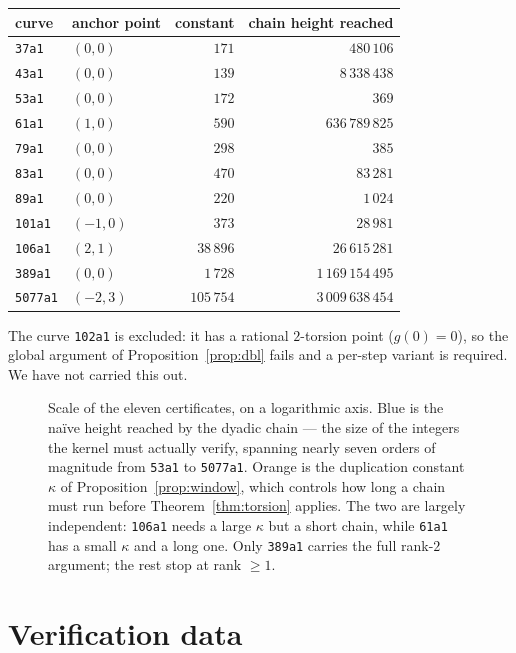 \documentclass[11pt,reqno]{amsart}
\newcommand{\pffig}[1]{}
\theoremstyle{plain}
\theoremstyle{definition}
\theoremstyle{remark}
\begin{document}
\begin{center}
\begin{tabular}{llrr}
\toprule
curve & anchor point & constant & chain height reached\\
\midrule
\texttt{37a1}   & $(0,0)$  & $171$ & $480\,106$\\
\texttt{43a1}   & $(0,0)$  & $139$ & $8\,338\,438$\\
\texttt{53a1}   & $(0,0)$  & $172$ & $369$\\
\texttt{61a1}   & $(1,0)$  & $590$ & $636\,789\,825$\\
\texttt{79a1}   & $(0,0)$  & $298$ & $385$\\
\texttt{83a1}   & $(0,0)$  & $470$ & $83\,281$\\
\texttt{89a1}   & $(0,0)$  & $220$ & $1\,024$\\
\texttt{101a1}  & $(-1,0)$ & $373$ & $28\,981$\\
\texttt{106a1}  & $(2,1)$  & $38\,896$ & $26\,615\,281$\\
\texttt{389a1}  & $(0,0)$  & $1\,728$ & $1\,169\,154\,495$\\
\texttt{5077a1} & $(-2,3)$ & $105\,754$ & $3\,009\,638\,454$\\
\bottomrule
\end{tabular}
\end{center}

The curve \texttt{102a1} is excluded: it has a rational $2$-torsion point
($g(0) = 0$), so the global argument of Proposition~\ref{prop:dbl} fails and
a per-step variant is required. We have not carried this out.

\begin{figure}[htbp]
\centering
\pffig{fig_cohort}
\caption{Scale of the eleven certificates, on a logarithmic axis. Blue is
the na\"ive height reached by the dyadic chain --- the size of the integers
the kernel must actually verify, spanning nearly seven orders of magnitude from
\texttt{53a1} to \texttt{5077a1}. Orange is the duplication constant
$\kappa$ of Proposition~\ref{prop:window}, which controls how long a chain
must run before Theorem~\ref{thm:torsion} applies. The two are largely
independent: \texttt{106a1} needs a large $\kappa$ but a short chain, while
\texttt{61a1} has a small $\kappa$ and a long one. Only \texttt{389a1}
carries the full rank-$2$ argument; the rest stop at rank $\ge 1$.}
\label{fig:cohort}
\end{figure}

\section{Verification data}
\end{document}
